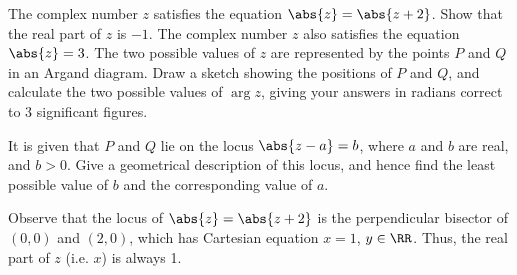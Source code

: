 \begin{problem}
    The complex number $z$ satisfies the equation $\abs{z} = \abs{z + 2}$. Show that the real part of $z$ is $-1$. The complex number $z$ also satisfies the equation $\abs{z} = 3$. The two possible values of $z$ are represented by the points $P$ and $Q$ in an Argand diagram. Draw a sketch showing the positions of $P$ and $Q$, and calculate the two possible values of $\arg z$, giving your answers in radians correct to 3 significant figures.

    It is given that $P$ and $Q$ lie on the locus $\abs{z - a} = b$, where $a$ and $b$ are real, and $b > 0$. Give a geometrical description of this locus, and hence find the least possible value of $b$ and the corresponding value of $a$.
\end{problem}
\begin{solution}
    Observe that the locus of $\abs{z} = \abs{z+2}$ is the perpendicular bisector of $(0, 0)$ and $(2, 0)$, which has Cartesian equation $x = 1$, $y \in \RR$. Thus, the real part of $z$ (i.e. $x$) is always 1.

    \begin{center}
\end{center}
\end{solution}
